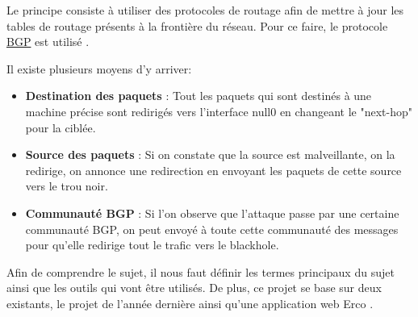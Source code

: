 Le principe consiste à utiliser des protocoles de routage afin de mettre à jour les tables de routage présents à la frontière du réseau. Pour ce faire, le protocole \hyperref[sec:BGP]{BGP} est utilisé \cite{Rfcbgp06}. 

Il existe plusieurs moyens d'y arriver:

\begin{itemize}
    \item \textbf{Destination des paquets} : Tout les paquets qui sont destinés à une machine précise sont redirigés vers l'interface null0 en changeant le "next-hop" pour la ciblée. 
    
    \item \textbf{Source des paquets} : Si on constate que la source est malveillante, on la redirige, on annonce une redirection en envoyant les paquets de cette source vers le trou noir.
    
    \item \textbf{Communauté BGP} : Si l'on observe que l'attaque passe par une certaine communauté BGP, on peut envoyé à toute cette communauté des messages pour qu'elle redirige tout le trafic vers le blackhole.
\end{itemize}

Afin de comprendre le sujet, il nous faut définir les termes principaux du sujet ainsi que les outils qui vont être utilisés. De plus, ce projet se base sur deux existants, le projet de l'année dernière \cite{PMCB18} ainsi qu'une application web Erco \cite{Erc16}.